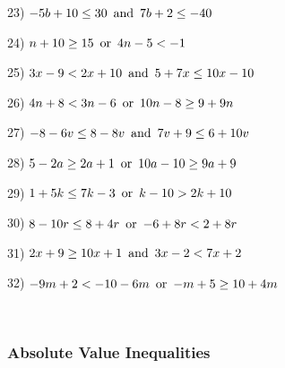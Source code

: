   23) $- 5 b + 10 \leq 30 \operatorname{~and~} 7 b + 2 \leq - 40$

  24) $n + 10 \geq 15 \operatorname{~or~} 4 n - 5 < - 1$

	25) $3 x - 9 < 2 x + 10 \operatorname{~and~} 5 + 7 x \leq 10 x - 10$
  	
  26) $4 n + 8 < 3 n - 6 \operatorname{~or~} 10 n - 8 \geq 9 + 9 n$

  27) $- 8 - 6 v \leq 8 - 8 v \operatorname{~and~} 7 v + 9 \leq 6 + 10 v$
  
  28) $5 - 2 a \geq 2 a + 1 \operatorname{~or~} 10 a - 10 \geq 9 a + 9$
  
  29) $1 + 5 k \leq 7 k - 3 \operatorname{~or~} k - 10 > 2 k + 10$
  
  30) $8 - 10 r \leq 8 + 4 r \operatorname{~or~} - 6 + 8 r < 2 + 8 r$

  31) $2 x + 9 \geq 10 x + 1 \operatorname{~and~} 3 x - 2 < 7 x + 2$

  32) $- 9 m + 2 < - 10 - 6 m \operatorname{~or~} - m + 5 \geq 10 + 4 m$
  
\vspace{2in}
~

\pagebreak

\subsubsection{Absolute Value Inequalities}\par

{}

